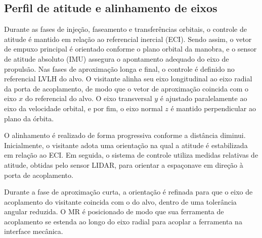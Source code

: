 \subsection{Perfil de atitude e alinhamento de eixos}
\label{sec:perfil_atitude}

Durante as fases de injeção, faseamento e transferências orbitais, o controle de atitude é mantido em relação ao referencial inercial (ECI).
Sendo assim, o vetor de empuxo principal é orientado conforme o plano orbital da manobra, e o sensor de atitude absoluto (IMU) assegura o apontamento adequado do eixo de propulsão.
Nas fases de aproximação longa e final, o controle é definido no referencial LVLH do alvo.
O visitante alinha seu eixo longitudinal ao eixo radial da porta de acoplamento, de modo que o vetor de aproximação coincida com o eixo ${x}$ do referencial do alvo.
O eixo transversal ${y}$ é ajustado paralelamente ao eixo da velocidade orbital, e por fim, o eixo normal ${z}$ é mantido perpendicular ao plano da órbita.

O alinhamento é realizado de forma progressiva conforme a distância diminui.
Inicialmente, o visitante adota uma orientação na qual a atitude é estabilizada em relação ao ECI. Em seguida, o sistema de controle utiliza medidas relativas de atitude, obtidas pelo sensor LIDAR, para orientar a espaçonave em direção à porta de acoplamento.

Durante a fase de aproximação curta, a orientação é refinada para que o eixo de acoplamento do visitante coincida com o do alvo, dentro de uma tolerância angular reduzida.
O MR é posicionado de modo que sua ferramenta de acoplamento se estenda ao longo do eixo radial para acoplar a ferramenta na interface mecânica.